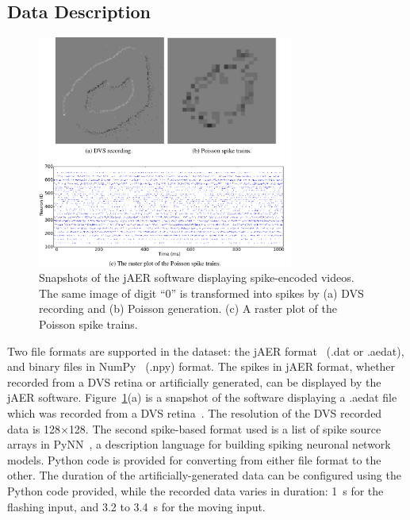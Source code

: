 \subsection{Data Description}
\begin{figure}[bt!]
	\centering
	\includegraphics[width=0.75\textwidth]{pics_bench/fig1}
	\caption{
		Snapshots of the jAER software displaying spike-encoded videos.
		The same image of digit ``0'' is transformed into spikes by (a) DVS recording and (b) Poisson generation.
		(c) A raster plot of the Poisson spike trains.}
	\label{fig:zero}
\end{figure}
Two file formats are supported in the dataset: the jAER format~\cite{delbruck2008frame} (.dat or .aedat), and binary files in NumPy~\cite{numpyPython} (.npy) format.
The spikes in jAER format, whether recorded from a DVS retina or artificially generated, can be displayed by the jAER software.
Figure~\ref{fig:zero}(a) is a snapshot of the software displaying a .aedat file which was recorded from a DVS retina~\cite{serrano2013128}.
The resolution of the DVS recorded data is 128$\times$128.
The second spike-based format used is a list of spike source arrays in PyNN~\cite{davison2008pynn}, a description language for building spiking neuronal network models.
Python code is provided for converting from either file format to the other.
The duration of the artificially-generated data can be configured using the Python code provided, while the recorded data varies in duration: 1~s for the flashing input, and 3.2 to 3.4~s for the moving input.




